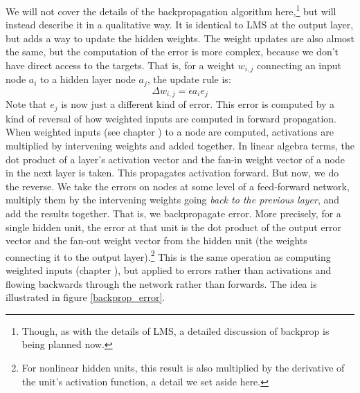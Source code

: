 We will not cover the details of the backpropagation algorithm here,\footnote{Though, as with the details of LMS, a detailed discussion of backprop is being planned now.} but will instead describe it in a qualitative way. It is identical to LMS at the output layer, but adds a way to update the hidden weights. The weight updates are also almost the same, but the computation of the error is more complex, because we don't have direct access to the targets. That is, for a weight $w_{i,j}$ connecting an input node $a_i$ to a hidden layer node $a_j$, the update rule is:
\[
\Delta w_{i,j}  =  \epsilon a_i e_j
\]
Note that $e_j$ is now just a different kind of error. This error is computed by a kind of reversal of how weighted inputs are computed in forward propagation. When weighted inputs (see chapter ) to a node are computed, activations are multiplied by intervening weights and added together. In linear algebra terms, the dot product of a layer's activation vector and the fan-in weight vector of a node in the next layer is taken. This propagates activation forward. But now, we do the reverse. We take the errors on nodes at some level of a feed-forward network, multiply them by the intervening weights going \emph{back to the previous layer}, and add the results together. That is, we backpropagate error. More precisely, for a single hidden unit, the error at that unit is the dot product of the output error vector and the fan-out weight vector from the hidden unit (the weights connecting it to the output layer).\footnote{For nonlinear hidden units, this result is also multiplied by the derivative of the unit's activation function, a detail we set aside here.} This is the same operation as computing weighted inputs (chapter ), but applied to errors rather than activations and flowing backwards through the network rather than forwards. The idea is illustrated in figure \ref{backprop_error}.

